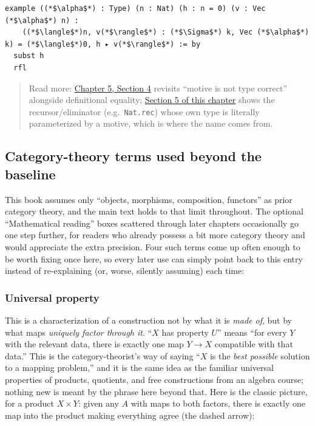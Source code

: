 \begin{lstlisting}
example ((*$\alpha$*) : Type) (n : Nat) (h : n = 0) (v : Vec (*$\alpha$*) n) :
    ((*$\langle$*)n, v(*$\rangle$*) : (*$\Sigma$*) k, Vec (*$\alpha$*) k) = (*$\langle$*)0, h ▸ v(*$\rangle$*) := by
  subst h
  rfl
\end{lstlisting}

\begin{quote}
Read more: \hyperref[sec:05-rigor-check:04-defeq-vs-propeq:1]{Chapter 5, Section 4} revisits ``motive is not type correct'' alongside definitional equality; \hyperref[sec:01-basics:05-pi-sigma-and-coc:1]{Section 5 of this chapter} shows the recursor/eliminator (e.g.~\texttt{Nat.rec}) whose own type is literally parameterized by a motive, which is where the name comes from.
\end{quote}

\subsection{Category-theory terms used beyond the baseline}\label{sec:01-basics:04-terminology:7}

This book assumes only ``objects, morphisms, composition, functors'' as prior category theory, and the main text holds to that limit throughout. The optional ``Mathematical reading'' boxes scattered through later chapters occasionally go one step further, for readers who already possess a bit more category theory and would appreciate the extra precision. Four such terms come up often enough to be worth fixing once here, so every later use can simply point back to this entry instead of re-explaining (or, worse, silently assuming) each time:

\subsubsection{Universal property}\label{sec:01-basics:04-terminology:8}

This is a characterization of a construction not by what it is \emph{made of}, but by what maps \emph{uniquely factor through it}. ``\(X\) has property \(U\)'' means ``for every \(Y\) with the relevant data, there is exactly one map \(Y \to X\) compatible with that data.'' This is the category-theorist's way of saying ``\(X\) is the \emph{best possible} solution to a mapping problem,'' and it is the same idea as the familiar universal properties of products, quotients, and free constructions from an algebra course; nothing new is meant by the phrase here beyond that. Here is the classic picture, for a product \(X \times Y\): given any \(A\) with maps to both factors, there is exactly one map into the product making everything agree (the dashed arrow):

